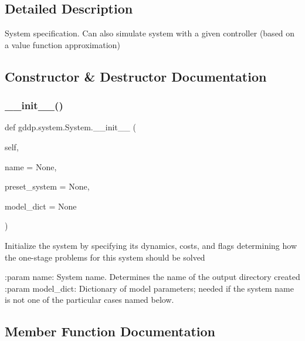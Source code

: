 \subsection{Detailed Description}
\begin{DoxyVerb}System specification. Can also simulate system with a given controller (based on a value
function approximation)
\end{DoxyVerb}
 

\subsection{Constructor \& Destructor Documentation}
\mbox{\label{classgddp_1_1system_1_1_system_afad3a747302ae7115f6776469c58a369}} 
\subsubsection{\texorpdfstring{\_\_init\_\_()}{\_\_init\_\_()}}
{\footnotesize\ttfamily def gddp.\+system.\+System.\+\_\+\+\_\+init\+\_\+\+\_\+ (\begin{DoxyParamCaption}\item[{}]{self,  }\item[{}]{name = {\ttfamily None},  }\item[{}]{preset\+\_\+system = {\ttfamily None},  }\item[{}]{model\+\_\+dict = {\ttfamily None} }\end{DoxyParamCaption})}

\begin{DoxyVerb}Initialize the system by specifying its dynamics, costs, and flags determining how the
one-stage problems for this system should be solved

:param name: System name. Determines the name of the output directory created
:param model_dict: Dictionary of model parameters; needed if the system name is not one of
the particular cases named below.
\end{DoxyVerb}
 

\subsection{Member Function Documentation}
\mbox{\label{classgddp_1_1system_1_1_system_a3fe9138f9a1e2e749a125763c2eb9a24}} 
